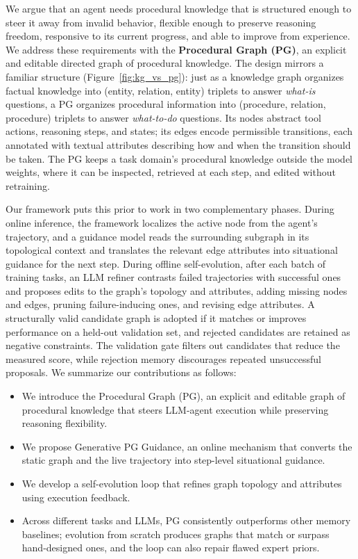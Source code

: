 We argue that an agent needs procedural knowledge that is structured enough to steer it away from invalid behavior, flexible enough to preserve reasoning freedom, responsive to its current progress, and able to improve from experience. We address these requirements with the \textbf{Procedural Graph (PG)}, an explicit and editable directed graph of procedural knowledge. The design mirrors a familiar structure (Figure~\ref{fig:kg_vs_pg}): just as a knowledge graph organizes factual knowledge into (entity, relation, entity) triplets to answer \textit{what-is} questions, a PG organizes procedural information into (procedure, relation, procedure) triplets to answer \textit{what-to-do} questions. Its nodes abstract tool actions, reasoning steps, and states; its edges encode permissible transitions, each annotated with textual attributes describing how and when the transition should be taken. The PG keeps a task domain's procedural knowledge outside the model weights, where it can be inspected, retrieved at each step, and edited without retraining.

Our framework puts this prior to work in two complementary phases. During online inference, the framework localizes the active node from the agent's trajectory, and a guidance model reads the surrounding subgraph in its topological context and translates the relevant edge attributes into situational guidance for the next step. During offline self-evolution, after each batch of training tasks, an LLM refiner contrasts failed trajectories with successful ones and proposes edits to the graph's topology and attributes, adding missing nodes and edges, pruning failure-inducing ones, and revising edge attributes. A structurally valid candidate graph is adopted if it matches or improves performance on a held-out validation set, and rejected candidates are retained as negative constraints. The validation gate filters out candidates that reduce the measured score, while rejection memory discourages repeated unsuccessful proposals.
We summarize our contributions as follows:

\begin{itemize}[leftmargin=*]

\item We introduce the Procedural Graph (PG), an explicit and editable graph of procedural knowledge that steers LLM-agent execution while preserving reasoning flexibility.

\item We propose Generative PG Guidance, an online mechanism that converts the static graph and the live trajectory into step-level situational guidance.

\item We develop a self-evolution loop that refines graph topology and attributes using execution feedback.

\item Across different tasks and LLMs, PG consistently outperforms other memory baselines; evolution from scratch produces graphs that match or surpass hand-designed ones, and the loop can also repair flawed expert priors.

\end{itemize}
